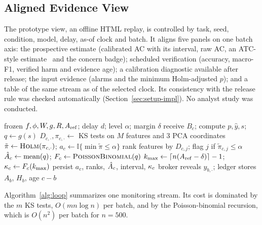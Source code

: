 \subsection{Aligned Evidence View}
The prototype view, an offline HTML replay, is controlled by task, seed,
condition, model, delay, as-of clock and batch. It aligns five panels on one batch
axis: the prospective estimate (calibrated AC with its interval, raw AC, an ATC-style
estimate~\cite{garg2022atc} and the concern badge); scheduled verification
(accuracy, macro-F1, verified harm and evidence age); a calibration diagnostic
available after release; the input evidence (alarms and the minimum Holm-adjusted
$p$); and a table of the same stream as of the selected clock. Its consistency with
the release rule was checked automatically (Section~\ref{sec:setup-impl}). No
analyst study was conducted.

\begin{algorithm}[t]
\caption{\idm{} monitoring loop for one stream}
\label{alg:loop}
\begin{algorithmic}[1]
\Require frozen $f,\phi,W,g,R,A_{\mathrm{ref}}$; delay $d$; level $\alpha$; margin $\delta$
   
    \State receive $B_c$; compute $p,\hat{y},s$; $q\gets g(s)$
    \State $D_{c,\cdot},\pi_{c,\cdot}\gets$ KS tests on $M$ features and 3 PCA coordinates
    \State $\tilde{\pi}\gets\textsc{Holm}(\pi_{c,\cdot})$; $a_c\gets\mathbb{I}\{\min\tilde{\pi}\le\alpha\}$
    \State rank features by $D_{c,j}$; flag $j$ if $\tilde{\pi}_{c,j}\le\alpha$
    \State $\hat{A}_c\gets\mathrm{mean}(q)$; $F_c\gets\textsc{PoissonBinomial}(q)$
    \State $k_{\max}\gets\lceil n(A_{\mathrm{ref}}-\delta)\rceil-1$; $\kappa_c\gets F_c(k_{\max})$
    \State persist $a_c$, ranks, $\hat{A}_c$, interval, $\kappa_c$
  \EndIf
   
    \State broker reveals $y_{b,\cdot}$; ledger stores $A_b$, $H_b$, age $c-b$
  \EndFor
\EndFor
\end{algorithmic}
\end{algorithm}

Algorithm~\ref{alg:loop} summarizes one monitoring stream. Its cost is dominated by
the $m$ KS tests, $O(mn\log n)$ per batch, and by the Poisson-binomial recursion,
which is $O(n^{2})$ per batch for $n=500$.

